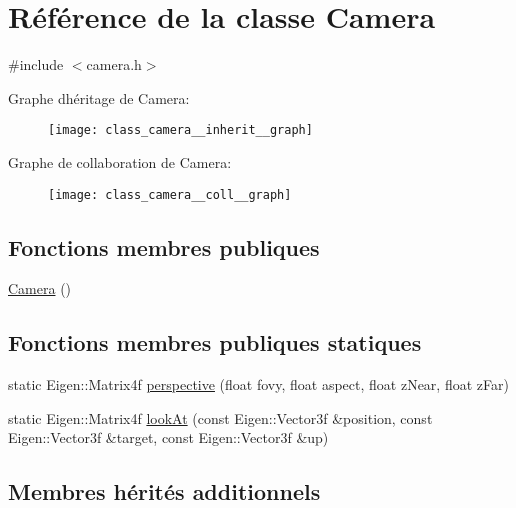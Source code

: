 \hypertarget{class_camera}{}\section{Référence de la classe Camera}
\label{class_camera}


{\ttfamily \#include $<$camera.\+h$>$}



Graphe d\textquotesingle{}héritage de Camera\+:
\nopagebreak
\begin{figure}[H]
\begin{center}
\leavevmode
\texttt{[image: class\_camera\_\_inherit\_\_graph]}
\end{center}
\end{figure}


Graphe de collaboration de Camera\+:
\nopagebreak
\begin{figure}[H]
\begin{center}
\leavevmode
\texttt{[image: class\_camera\_\_coll\_\_graph]}
\end{center}
\end{figure}
\subsection*{Fonctions membres publiques}
\begin{DoxyCompactItemize}
\item 
\hyperlink{class_camera_a01f94c3543f56ede7af49dc778f19331}{Camera} ()
\end{DoxyCompactItemize}
\subsection*{Fonctions membres publiques statiques}
\begin{DoxyCompactItemize}
\item 
static Eigen\+::\+Matrix4f \hyperlink{class_camera_aa63f48a3280871eba3a6f74a3c0f2e2e}{perspective} (float fovy, float aspect, float z\+Near, float z\+Far)
\item 
static Eigen\+::\+Matrix4f \hyperlink{class_camera_a683a2e432969a485412c28e18567c174}{look\+At} (const Eigen\+::\+Vector3f \&position, const Eigen\+::\+Vector3f \&target, const Eigen\+::\+Vector3f \&up)
\end{DoxyCompactItemize}
\subsection*{Membres hérités additionnels}


